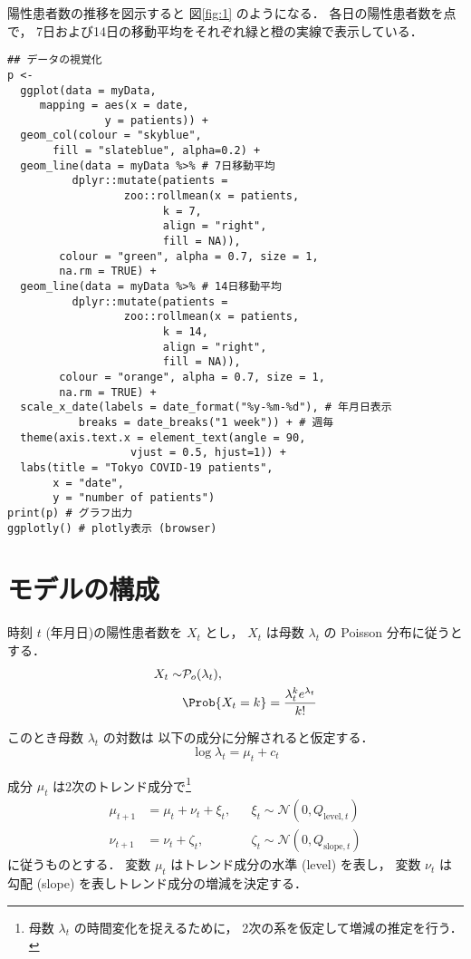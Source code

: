 \documentclass[10pt,oneside,fleqn]{scrartcl}
\begin{document}
陽性患者数の推移を図示すると
図\ref{fig:1} のようになる．
各日の陽性患者数を点で，
7日および14日の移動平均をそれぞれ緑と橙の実線で表示している．

\begin{figure}[htbp]
  \centering
  \myGraph[1]{}
\end{figure}

\begin{verbatim}
## データの視覚化
p <-
  ggplot(data = myData,
	 mapping = aes(x = date,
		       y = patients)) +
  geom_col(colour = "skyblue",
	   fill = "slateblue", alpha=0.2) + 
  geom_line(data = myData %>% # 7日移動平均
	      dplyr::mutate(patients =
			      zoo::rollmean(x = patients,
					    k = 7, 
					    align = "right",
					    fill = NA)),
	    colour = "green", alpha = 0.7, size = 1,
	    na.rm = TRUE) +
  geom_line(data = myData %>% # 14日移動平均
	      dplyr::mutate(patients =
			      zoo::rollmean(x = patients,
					    k = 14, 
					    align = "right",
					    fill = NA)),
	    colour = "orange", alpha = 0.7, size = 1,
	    na.rm = TRUE) +
  scale_x_date(labels = date_format("%y-%m-%d"), # 年月日表示
	       breaks = date_breaks("1 week")) + # 週毎
  theme(axis.text.x = element_text(angle = 90, 
				   vjust = 0.5, hjust=1)) +
  labs(title = "Tokyo COVID-19 patients",
       x = "date",
       y = "number of patients")
print(p) # グラフ出力
ggplotly() # plotly表示 (browser)
\end{verbatim}

\section{モデルの構成}
\label{sec:org8cd1851}

時刻 \(t\) (年月日)の陽性患者数を \(X_{t}\) とし，
\(X_{t}\) は母数 \(\lambda_{t}\) の Poisson 分布に従うとする．
\begin{align}
  X_{t}\sim &\mathcal{P}_{o}(\lambda_{t}), \\   
  &\Prob{X_{t}=k}=\frac{\lambda_{t}^{k}e^{\lambda_{t}}}{k!}
\end{align}

このとき母数 \(\lambda_{t}\) の対数は
以下の成分に分解されると仮定する．
\begin{equation}
  \log\lambda_{t}
  =\mu_{t}+c_{t}
\end{equation}

成分 \(\mu_{t}\) は2次のトレンド成分で\footnote{母数 \(\lambda_{t}\) の時間変化を捉えるために，
2次の系を仮定して増減の推定を行う．}
\begin{align}
  \mu_{t+1}
  &=\mu_{t}+\nu_{t}+\xi_{t},&&\xi_{t}\sim\mathcal{N}(0,Q_{\mathrm{level},t})\\
  \nu_{t+1}
  &=\nu_{t}+\zeta_{t},&&\zeta_{t}\sim\mathcal{N}(0,Q_{\mathrm{slope},t})
\end{align}
に従うものとする．
変数 \(\mu_{t}\) はトレンド成分の水準 (level) を表し，
変数 \(\nu_{t}\) は勾配 (slope) を表しトレンド成分の増減を決定する．
\end{document}
